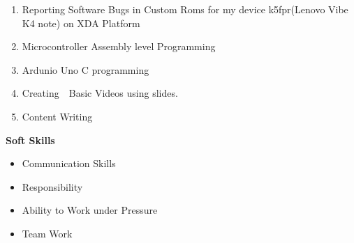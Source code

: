 \documentclass[12pt]{article}
\begin{document}
\begin{enumerate}
	\item {\fontsize{13pt}{15.6pt}\selectfont Reporting Software Bugs in Custom Roms for my device k5fpr(Lenovo Vibe K4 note) on XDA Platform\par}\par

	\item {\fontsize{13pt}{15.6pt} Microcontroller Assembly level Programming\par}\par

	\item {\fontsize{13pt}{15.6pt}\selectfont Ardunio Uno C programming\par}\par

	\item {\fontsize{13pt}{15.6pt}\selectfont Creating\ \ Basic Videos  using slides.\par}\par

	\item {\fontsize{13pt}{15.6pt}\selectfont Content Writing\par}
\end{enumerate}\par

\vspace{0.1cm}
{\fontsize{14pt}{16.8pt}\selectfont \textbf{Soft Skills}\par}\par


\begin{itemize}
	\item {\fontsize{13pt}{15.6pt}\selectfont Communication Skills\par}\par

	\item {\fontsize{13pt}{15.6pt}\selectfont Responsibility\par}\par

	\item {\fontsize{13pt}{15.6pt}\selectfont Ability to Work under Pressure\par}\par

	\item {\fontsize{13pt}{15.6pt}\selectfont Team Work\par}
\par
\end{itemize}
\end{document}
